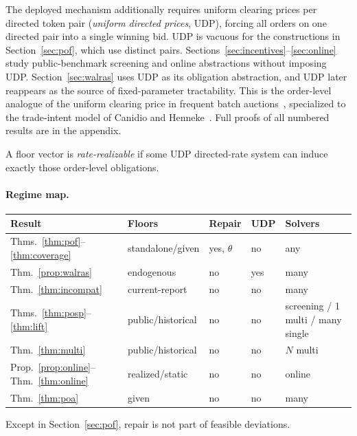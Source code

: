 \documentclass{llncs}
\begin{document}
The deployed mechanism additionally requires uniform clearing prices per
directed token pair (\emph{uniform directed prices}, UDP), forcing all
orders on one directed pair into a single winning bid. UDP is vacuous for
the constructions in Section~\ref{sec:pof}, which use distinct pairs.
Sections~\ref{sec:incentives}--\ref{sec:online} study public-benchmark
screening and online abstractions without imposing UDP. Section~\ref{sec:walras}
uses UDP as its obligation abstraction, and UDP later reappears as the
source of fixed-parameter tractability. This is the order-level analogue of the uniform clearing
price in frequent batch auctions~\cite{budish2015}, specialized to the
trade-intent model of Canidio and Henneke~\cite{canidio2024}. Full
proofs of all numbered results are in the appendix.

A floor vector is \emph{rate-realizable} if some UDP directed-rate system
can induce exactly those order-level obligations.

\paragraph{Regime map.}
\vspace{-0.5em}
\begin{center}
\scriptsize
\renewcommand{\arraystretch}{0.82}
\setlength{\tabcolsep}{2pt}
\begin{tabular}{@{}p{}p{}p{}p{}p{}@{}}
\toprule
Result & Floors & Repair & UDP & Solvers\\
\midrule
Thms.~\ref{thm:pof}--\ref{thm:coverage} & standalone/given & yes, $\theta$ & no & any\\
Thm.~\ref{prop:walras} & endogenous & no & yes & many\\
Thm.~\ref{thm:incompat} & current-report & no & no & many\\
Thms.~\ref{thm:posp}--\ref{thm:lift} & public/historical & no & no & screening / 1 multi / many single\\
Thm.~\ref{thm:multi} & public/historical & no & no & $N$ multi\\
Prop.~\ref{prop:online}--Thm.~\ref{thm:online} & realized/static & no & no & online\\
Thm.~\ref{thm:poa} & given & no & no & many\\
\bottomrule
\end{tabular}
\end{center}
\vspace{-0.7em}
Except in Section~\ref{sec:pof}, repair is not part of feasible deviations.
\end{document}
